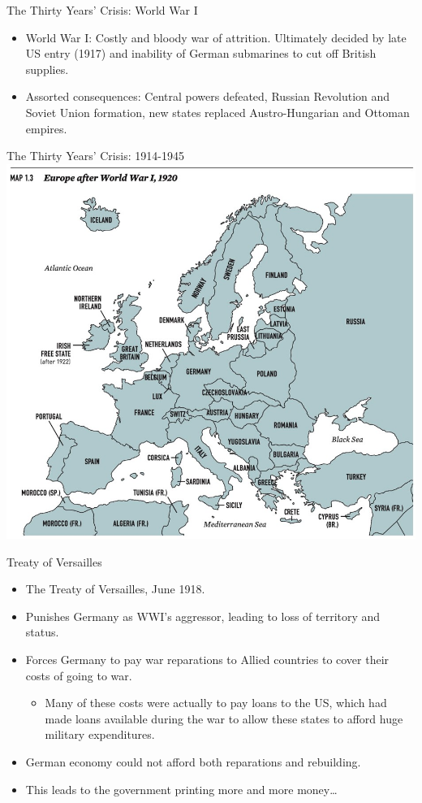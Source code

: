 \documentclass[handout]{beamer}
\begin{document}
\begin{frame}{\LARGE The Thirty Years' Crisis: World War I}
	\begin{itemize}
		\item World War I: Costly and bloody war of attrition. Ultimately decided by late US entry (1917) and inability of German submarines to cut off British supplies.
		\item Assorted consequences: Central powers defeated, Russian Revolution and Soviet Union formation, new states replaced Austro-Hungarian and Ottoman empires.
	\end{itemize}
\end{frame}

\begin{frame}{\LARGE The Thirty Years' Crisis: 1914-1945}
	\centering
\includegraphics[width=\textwidth,height=.9\textheight,keepaspectratio]{Europe1920.jpg}
\end{frame}

\begin{frame}{\LARGE Treaty of Versailles}
	\begin{itemize}
		\item The Treaty of Versailles, June 1918.
		\item Punishes Germany as WWI's aggressor, leading to loss of territory and status.
		\item Forces Germany to pay war reparations to Allied countries to cover their costs of going to war.
		\begin{itemize}
			\item Many of these costs were actually to pay loans to the US, which had made loans available during the war to allow these states to afford huge military expenditures.
		\end{itemize}
		\item German economy could not afford both reparations and rebuilding.
		\item This leads to the government printing more and more money…		
	\end{itemize}
\end{frame}
\end{document}
